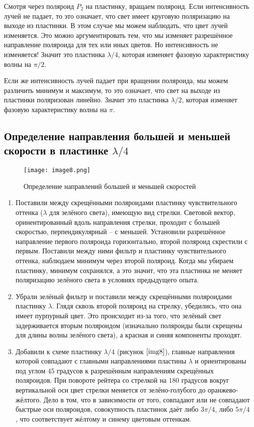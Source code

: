 \documentclass[a4paper,12pt]{article} %
\begin{document}
Смотря через поляроид $P_2$ на пластинку, вращаем поляроид. Если интенсивность лучей не падает, то это означает, что свет имеет круговую поляризацию на выходе из пластинки. В этом случае мы можем наблюдать, что цвет лучей изменяется. Это можно аргументировать тем, что мы изменяет разрешённое направление поляроида для тех или иных цветов. Но интенсивность не изменяется! Значит это пластинка $\lambda/4$, которая изменяет фазовую характеристику волны на $\pi/2$.

Если же интенсивность лучей падает при вращении поляроида, мы можем различить минимум и максимум, то это означает, что свет на выходе из пластинки поляризован линейно. Значит это пластинка $\lambda/2$, которая изменяет фазовую характеристику волны на $\pi$.

\subsection{Определение направления большей и меньшей скорости в пластинке $\lambda/4$}

\begin{wrapfigure}{r}{0.35\linewidth}
    \texttt{[image: image8.png]}
    \caption{Определение направлений большей и меньшей скоростей}
    \label{img8}
\end{wrapfigure}

\begin{enumerate}
    \item Поставили между скрещёнными поляроидами пластинку чувствительного оттенка ($\lambda$ для зелёного света), имеющую вид стрелки. Световой вектор, оринентированный вдоль направления стрелки, проходит с большей скоростью, перпендикулярный -- с меньшей.
    Установили разрешённое направление первого поляроида горизонтально, второй поляроид скрестили с первым. Поставили между ними фильтр и пластинку чувствительного оттенка, наблюдаем минимум через второй поляроид. Когда мы убираем пластинку, минимум сохранялся, а это значит, что эта пластинка не меняет поляризацию зелёного света в условиях предыдущего опыта.
    \item Убрали зелёный фильтр и поставили между скрещёнными поляроидами пластинку $\lambda$. Глядя сквозь второй поляроид на стрелку, убедились, что она имеет пурпурный цвет. Это происходит из-за того, что зелёный свет задерживается вторым поляроидом (изначально поляроиды были скрещены для длины волны зелёного света), а красная и синяя компоненты проходят.
    \item Добавили к схеме пластинку $\lambda/4$ (рисунок $\ref{img8}$), главные направления которой совпадают с главными направлениями пластины $\lambda$ и ориентированы под углом $45$ градусов к разрешённым направлениям скрещённых поляроидов.
    При повороте рейтера со стрелкой на $180$ градусов вокруг вертикальной оси цвет стрелки меняется от зелёно-голубого до оранжево-жёлтого. Дело в том, что в зависимости от того, совпадают или не совпадают быстрые оси поляроидов, совокупность пластинок даёт либо $3\pi/4$, либо $5\pi/4$, что соответствует жёлтому и синему цветовым оттенкам. 
\end{enumerate}
\end{document}
